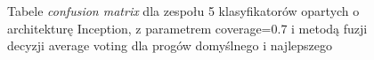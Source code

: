 \documentclass[polish,12pt]{aghthesis}
\begin{document}
\begin{figure}[H]
    \begin{adjustbox}{minipage=1.0\paperwidth, pagecenter}
    \centering
    \qquad
    \end{adjustbox}
    \label{fig:inc-ens-5-0.7-avg-thresh-matrices}
    \caption{Tabele \textit{confusion matrix} dla zespołu 5 klasyfikatorów opartych o architekturę Inception, z parametrem coverage=0.7 i metodą fuzji decyzji average voting dla progów domyślnego i najlepszego}
\end{figure}
\end{document}
